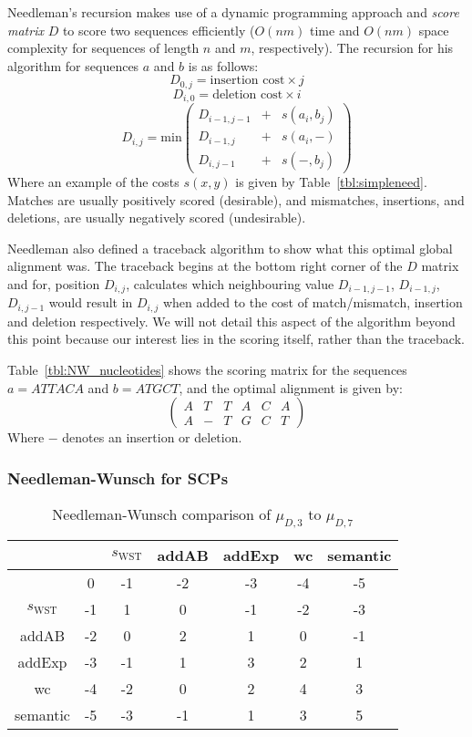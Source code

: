 Needleman's recursion makes use of a dynamic programming approach and \textit{score matrix} $D$ to score two sequences efficiently ($O(nm)$ time and $O(nm)$ space complexity for sequences of length $n$ and $m$, respectively). The recursion for his algorithm for sequences $a$ and $b$ is as follows:
\[
D_{0,j}=\text{insertion cost} \times j
\]
\[
D_{i,0}=\text{deletion cost} \times i
\]
\[
D_{i,j}=\text{min}
\begin{pmatrix}
D_{i-1,j-1} & + & s(a_i,b_j)\\
D_{i-1,j} & + & s(a_i, - )\\
D_{i,j-1} & + & s(-,b_j)
\end{pmatrix}
\]
Where an example of the costs $s(x,y)$ is given by Table~\ref{tbl:simpleneed}. Matches are usually positively scored (desirable), and mismatches, insertions, and deletions, are usually negatively scored (undesirable).

Needleman also defined a traceback algorithm to show what this optimal global alignment was. The traceback begins at the bottom right corner of the $D$ matrix and for, position $D_{i,j}$, calculates which neighbouring value $D_{i-1,j-1}$, $D_{i-1,j}$, $D_{i,j-1}$ would result in $D_{i,j}$ when added to the cost of match/mismatch, insertion and deletion respectively. We will not detail this aspect of the algorithm beyond this point because our interest lies in the scoring itself, rather than the traceback.

Table~\ref{tbl:NW_nucleotides} shows the scoring matrix for the sequences $a=ATTACA$ and $b=ATGCT$, and the optimal alignment is given by:
\[
\begin{pmatrix}
A & T & T & A & C & A \\
A & - & T & G & C & T
\end{pmatrix}
\]
Where $-$ denotes an insertion or deletion.

\subsubsection{Needleman-Wunsch for SCPs}

\begin{table}
\begin{center}
\begin{tabular}{c | c c c c c c }
 & & $s_\text{WST}$ & addAB & addExp & wc & semantic\\
 \hline
 & 0 & -1 & -2 & -3 & -4 & -5\\
$s_\text{WST}$ & -1 & 1 & 0 & -1 & -2 & -3\\
addAB & -2 & 0 & 2 & 1 & 0 & -1\\
addExp & -3 & -1 & 1 & 3 & 2 & 1\\
wc & -4 & -2 & 0 & 2 & 4 & 3\\
semantic & -5 & -3 & -1 & 1 & 3 & 5
\end{tabular}
\caption{Needleman-Wunsch comparison of $\mu_{D,3}$ to $\mu_{D,7}$}
\label{tbl:compD3D7}
\end{center}
\end{table}


